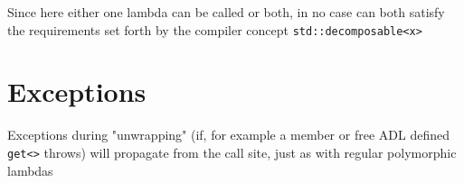 \documentclass{article}
\begin{document}
Since here either one lambda can be called or both, in no case can both
satisfy the requirements set forth by the compiler concept
\texttt{std::decomposable<x>}


\section{Exceptions}
Exceptions during "unwrapping" (if, for example a member or free ADL defined
\texttt{get<>} throws) will propagate from the call site, just as with regular
polymorphic lambdas
\end{document}
